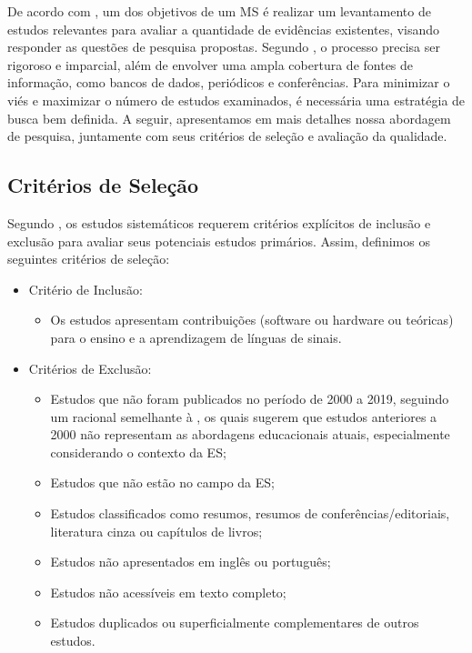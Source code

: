 De acordo com  , um dos objetivos de um MS é realizar um levantamento de estudos relevantes para avaliar a quantidade de evidências existentes, visando responder as questões de pesquisa propostas. Segundo , o processo precisa ser rigoroso e imparcial, além de envolver uma ampla cobertura de fontes de informação, como bancos de dados, periódicos e conferências. Para minimizar o viés e maximizar o número de estudos examinados, é necessária uma estratégia de busca bem definida. A seguir, apresentamos em mais detalhes nossa abordagem de pesquisa, juntamente com seus critérios de seleção e avaliação da qualidade.

\subsection{Critérios de Seleção}
\label{ms:conducao-busca}

Segundo , os estudos sistemáticos requerem critérios explícitos de inclusão e exclusão para avaliar seus potenciais estudos primários. Assim, definimos os seguintes critérios de seleção:

\begin{itemize}
    \item Critério de Inclusão:
    \begin{itemize}
        \item Os estudos apresentam contribuições (software ou hardware ou teóricas) para o ensino e a aprendizagem de línguas de sinais.
    \end{itemize}
    \item Critérios de Exclusão:
    \begin{itemize}
        \item Estudos que não foram publicados no período de 2000 a 2019, seguindo um racional semelhante à , os quais sugerem que estudos anteriores a 2000 não representam as abordagens educacionais atuais, especialmente considerando o contexto da ES;
        \item Estudos que não estão no campo da ES;
        \item Estudos classificados como resumos, resumos de conferências/editoriais, literatura cinza ou capítulos de livros;
        \item Estudos não apresentados em inglês ou português;
        \item Estudos não acessíveis em texto completo;
        \item Estudos duplicados ou superficialmente complementares de outros estudos.
    \end{itemize}
\end{itemize}


